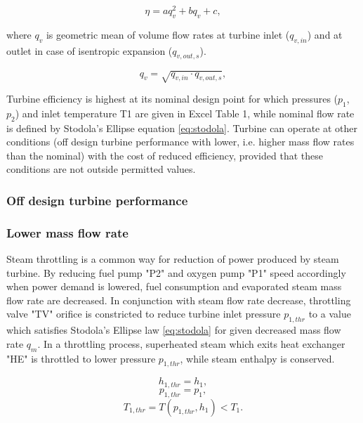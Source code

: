 \documentclass{article}
\begin{document}
	\begin{equation}\label{eq:eta2}
		\eta = aq_v^2 + bq_v + c,
	\end{equation}
	
	\noindent
	where $q_v$ is geometric mean of volume flow rates at turbine inlet ($q_{v,in}$) and at outlet in case of isentropic expansion ($q_{v,out,s}$). 
	
	\begin{equation}\label{eq:q_v}
		q_v = \sqrt{q_{v,in} \cdot q_{v,out,s}},
	\end{equation}
	
	Turbine efficiency is highest at its nominal design point for which 
	pressures ($p_1$, $p_2$) and inlet temperature T1 are given in Excel Table 
	1, while nominal flow rate is defined by Stodola’s Ellipse equation 
	\ref{eq:stodola}. Turbine can operate at other conditions (off design 
	turbine performance with lower, i.e. higher mass flow rates than the 
	nominal) with the cost of reduced efficiency, provided that these 
	conditions are not outside permitted values.
	
	\subsubsection*{Off design turbine performance}
	
	\subsubsection*{Lower mass flow rate}
	
	Steam throttling is a common way for reduction of power produced by steam 
	turbine. By reducing fuel pump "P2" and oxygen pump "P1" speed accordingly 
	when power demand is lowered, fuel consumption and evaporated steam mass 
	flow rate are decreased. In conjunction with steam flow rate decrease, 
	throttling valve "TV" orifice is constricted to reduce turbine inlet 
	pressure $p_{1,thr}$ to a value which satisfies Stodola’s Ellipse law 
	\ref{eq:stodola} for given decreased mass flow rate $q_m$. In a throttling 
	process, superheated steam which exits heat exchanger "HE" is throttled to 
	lower pressure $p_{1,thr}$, while steam enthalpy is conserved.
	
	\begin{equation}\label{eq:ent_preserve1}
		h_{1,thr} = h_1,
	\end{equation}
	\begin{equation}\label{eq:ent_preserve2}
	p_{1,thr} = p_1,
	\end{equation}
	\begin{equation}\label{eq:ent_preserve3}
	T_{1,thr} = T(p_{1,thr},h_1) < T_1.
	\end{equation}
	
\end{document}
